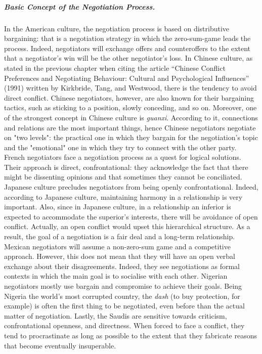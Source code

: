 \documentclass[../main.tex]{subfiles}
\begin{document}
\subparagraph{Basic Concept of the Negotiation Process.} In the American culture, the negotiation process is based on distributive bargaining: that is a negotiation strategy in which the zero-sum-game leads the process. Indeed, negotiators will exchange offers and counteroffers to the extent that a negotiator's win will be the other negotiator's loss. In Chinese culture, as stated in the previous chapter when citing the article “Chinese Conflict Preferences and Negotiating Behaviour: Cultural and Psychological Influences” (1991) written by Kirkbride, Tang, and Westwood, there is the tendency to avoid direct conflict. Chinese negotiators, however, are also known for their bargaining tactics, such as sticking to a position, slowly conceding, and so on. Moreover, one of the strongest concept in Chinese culture is \textit{guanxi}. According to it, connections and relations are the most important things, hence Chinese negotiators negotiate on "two levels": the practical one in which they bargain for the negotiation's topic and the "emotional" one in which they try to connect with the other party. French negotiators face a negotiation process as a quest for logical solutions. Their approach is direct, confrontational: they acknowledge the fact that there might be dissenting opinions and that sometimes they cannot be conciliated. Japanese culture precludes negotiators from being openly confrontational. Indeed, according to Japanese culture, maintaining harmony in a relationship is very important. Also, since in Japanese culture, in a relationship an inferior is expected to accommodate the superior's interests, there will be avoidance of open conflict. Actually, an open conflict would upset this hierarchical structure. As a result, the goal of a negotiation is a fair deal and a long-term relationship. Mexican negotiators will assume a non-zero-sum game and a competitive approach. However, this does not mean that they will have an open verbal exchange about their disagreements. Indeed, they see negotiations as formal contexts in which the main goal is to socialise with each other. Nigerian negotiators mostly use bargain and compromise to achieve their goals. Being Nigeria the world's most corrupted country, the \textit{dash} (to buy protection, for example) is often the first thing to be negotiated, even before than the actual matter of negotiation. Lastly, the Saudis are sensitive towards criticism, confrontational openness, and directness. When forced to face a conflict, they tend to procrastinate as long as possible to the extent that they fabricate reasons that become eventually insuperable.
\end{document}

